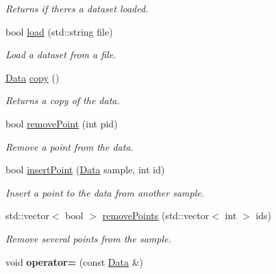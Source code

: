 \begin{DoxyCompactItemize}
\begin{DoxyCompactList}\small\item\em Returns if there\textquotesingle{}s a dataset loaded. \end{DoxyCompactList}\item 
bool \hyperlink{class_data_ac2ed251251be234c607f486e16902112}{load} (std\+::string file)
\begin{DoxyCompactList}\small\item\em Load a dataset from a file. \end{DoxyCompactList}\item 
\hyperlink{class_data}{Data} \hyperlink{class_data_afb7687021aa7d5f1ecae464eee601710}{copy} ()
\begin{DoxyCompactList}\small\item\em Returns a copy of the data. \end{DoxyCompactList}\item 
bool \hyperlink{class_data_ad927494a13a5018ff3644212d7234a03}{remove\+Point} (int pid)
\begin{DoxyCompactList}\small\item\em Remove a point from the data. \end{DoxyCompactList}\item 
bool \hyperlink{class_data_abb6aade47d78a284301c32e82b2cbee2}{insert\+Point} (\hyperlink{class_data}{Data} sample, int id)
\begin{DoxyCompactList}\small\item\em Insert a point to the data from another sample. \end{DoxyCompactList}\item 
std\+::vector$<$ bool $>$ \hyperlink{class_data_a6cc376e614e5440061c66833e1c8d30a}{remove\+Points} (std\+::vector$<$ int $>$ ids)
\begin{DoxyCompactList}\small\item\em Remove several points from the sample. \end{DoxyCompactList}\item 
\mbox{\label{class_data_a02affbc0f8564106c84dc59f34666912}} 
void {\bfseries operator=} (const \hyperlink{class_data}{Data} \&)
\end{DoxyCompactItemize}
